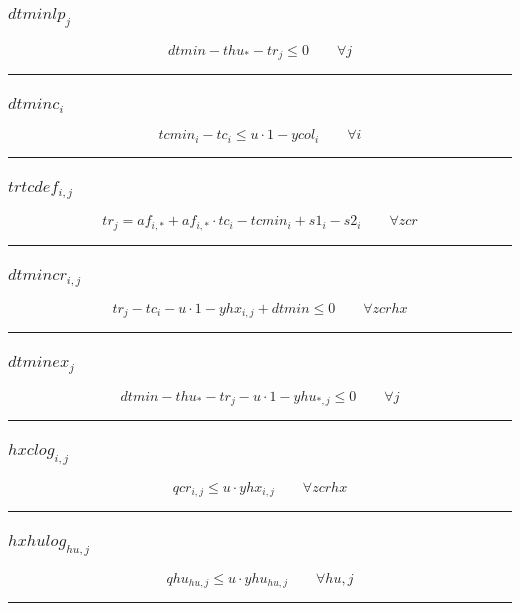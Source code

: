\documentclass[11pt]{article}
\begin{document}
\subsubsection*{$dtminlp_{j}$}
\begin{equation*}
dtmin - thu_{*} - tr_{j} \leq 0\qquad \forall j
\end{equation*}
\vspace{5pt}
\hrule
\subsubsection*{$dtminc_{i}$}
\begin{equation*}
tcmin_{i} - tc_{i} \leq u \cdot 1 - ycol_{i}\qquad \forall i
\end{equation*}
\vspace{5pt}
\hrule
\subsubsection*{$trtcdef_{i,j}$}
\begin{equation*}
tr_{j} = af_{i,*} + af_{i,*} \cdot tc_{i} - tcmin_{i} + s1_{i} - s2_{i}\qquad \forall zcr
\end{equation*}
\vspace{5pt}
\hrule
\subsubsection*{$dtmincr_{i,j}$}
\begin{equation*}
tr_{j} - tc_{i} - u \cdot 1 - yhx_{i,j} + dtmin \leq 0\qquad \forall zcrhx
\end{equation*}
\vspace{5pt}
\hrule
\subsubsection*{$dtminex_{j}$}
\begin{equation*}
dtmin - thu_{*} - tr_{j} - u \cdot 1 - yhu_{*,j} \leq 0\qquad \forall j
\end{equation*}
\vspace{5pt}
\hrule
\subsubsection*{$hxclog_{i,j}$}
\begin{equation*}
qcr_{i,j} \leq u \cdot yhx_{i,j}\qquad \forall zcrhx
\end{equation*}
\vspace{5pt}
\hrule
\subsubsection*{$hxhulog_{hu,j}$}
\begin{equation*}
qhu_{hu,j} \leq u \cdot yhu_{hu,j}\qquad \forall hu,j
\end{equation*}
\vspace{5pt}
\hrule
\end{document}
